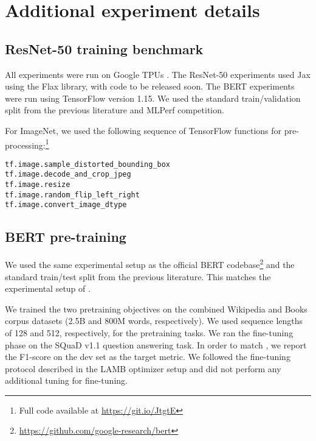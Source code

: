 \documentclass{article}
\begin{document}
\clearpage


\appendix
\section{Additional experiment details}\label{appendix:experiment-details}

\subsection{ResNet-50 training benchmark}

All experiments were run on Google TPUs \citep{jouppi2017datacenter}. 
The ResNet-50 experiments used Jax \citep{jax2018github} using the Flax library, with code to be released soon. The BERT experiments were run using TensorFlow \citep{abadi2016tensorflow}  version 1.15.
We used the standard train/validation split from the previous literature and MLPerf competition.

For ImageNet, we used the following sequence of TensorFlow functions for pre-processing:\footnote{Full code available at \url{https://git.io/JtgtE}}
\begin{lstlisting}
tf.image.sample_distorted_bounding_box
tf.image.decode_and_crop_jpeg
tf.image.resize
tf.image.random_flip_left_right
tf.image.convert_image_dtype
\end{lstlisting}

\subsection{BERT pre-training}\label{appendix:bert_experiment_details}

We used the same experimental setup as the official BERT codebase\footnote{\url{https://github.com/google-research/bert}} and the standard train/test split from the previous literature. This matches the experimental setup of \citet{you2019lamb}.

We trained the two pretraining objectives on the combined Wikipedia and Books corpus \citep{ZhuEtAl2015bookcorpus} datasets (2.5B and 800M words, respectively). We used sequence lengths of 128 and 512, respectively, for the pretraining tasks. We ran the fine-tuning phase on the SQuaD v1.1 question answering task. In order to match \citet{you2019lamb}, we report the F1-score on the dev set as the target metric. We followed the fine-tuning protocol described in the LAMB optimizer setup and did not perform any additional tuning for fine-tuning.
\end{document}
